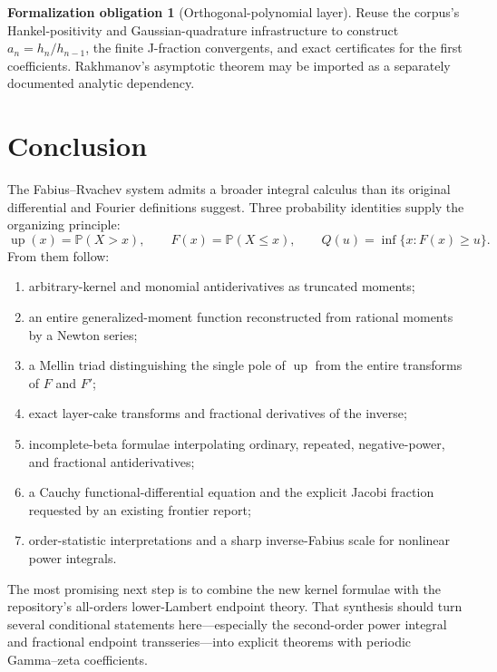 \documentclass[11pt,oneside]{article}
\numberwithin{equation}{section}
\theoremstyle{definition}
\newtheorem{obligation}[theorem]{Formalization obligation}
\theoremstyle{remark}
\newcommand{\Up}{\operatorname{up}}
\newcommand{\Prob}{\mathbb P}
\newcommand{\QF}{Q}
\begin{document}
\begin{obligation}[Orthogonal-polynomial layer]
Reuse the corpus's Hankel-positivity and Gaussian-quadrature infrastructure to
construct \(a_n=h_n/h_{n-1}\), the finite J-fraction convergents, and exact
certificates for the first coefficients.  Rakhmanov's asymptotic theorem may be
imported as a separately documented analytic dependency.
\end{obligation}

\section{Conclusion}
\label{sec:conclusion}

The Fabius--Rvachev system admits a broader integral calculus than its original
differential and Fourier definitions suggest.  Three probability identities
supply the organizing principle:
\begin{equation}
 \Up(x)=\Prob(X>x),
 \qquad
 F(x)=\Prob(X\le x),
 \qquad
 \QF(u)=\inf\{x:F(x)\ge u\}.
 \label{eq:three-probability-objects}
\end{equation}
From them follow:
\begin{enumerate}
\item arbitrary-kernel and monomial antiderivatives as truncated moments;
\item an entire generalized-moment function reconstructed from rational moments
      by a Newton series;
\item a Mellin triad distinguishing the single pole of \(\Up\) from the entire
      transforms of \(F\) and \(F'\);
\item exact layer-cake transforms and fractional derivatives of the inverse;
\item incomplete-beta formulae interpolating ordinary, repeated, negative-power,
      and fractional antiderivatives;
\item a Cauchy functional-differential equation and the explicit Jacobi fraction
      requested by an existing frontier report;
\item order-statistic interpretations and a sharp inverse-Fabius scale for
      nonlinear power integrals.
\end{enumerate}

The most promising next step is to combine the new kernel formulae with the
repository's all-orders lower-Lambert endpoint theory.  That synthesis should
turn several conditional statements here---especially the second-order power
integral and fractional endpoint transseries---into explicit theorems with
periodic Gamma--zeta coefficients.
\end{document}
